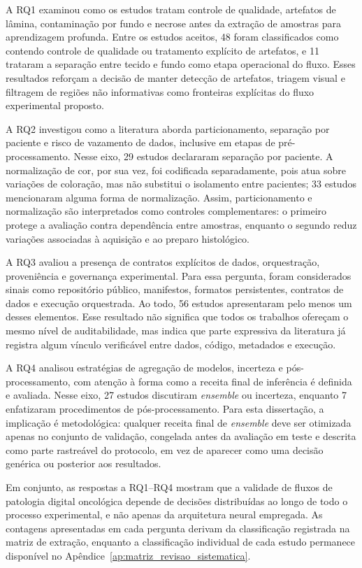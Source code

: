 A RQ1 examinou como os estudos tratam controle de qualidade, artefatos de
lâmina, contaminação por fundo e necrose antes da extração de amostras para
aprendizagem profunda. Entre os estudos aceitos, 48 foram classificados como
contendo controle de qualidade ou tratamento explícito de artefatos, e 11
trataram a separação entre tecido e fundo como etapa operacional do fluxo. Esses
resultados reforçam a decisão de manter detecção de artefatos, triagem visual e
filtragem de regiões não informativas como fronteiras explícitas do fluxo
experimental proposto.

A RQ2 investigou como a literatura aborda particionamento, separação por
paciente e risco de vazamento de dados, inclusive em etapas de pré-processamento.
Nesse eixo, 29 estudos declararam separação por paciente. A normalização de cor,
por sua vez, foi codificada separadamente, pois atua sobre variações de
coloração, mas não substitui o isolamento entre pacientes; 33 estudos
mencionaram alguma forma de normalização. Assim, particionamento e normalização
são interpretados como controles complementares: o primeiro protege a avaliação
contra dependência entre amostras, enquanto o segundo reduz variações associadas
à aquisição e ao preparo histológico.

A RQ3 avaliou a presença de contratos explícitos de dados, orquestração,
proveniência e governança experimental. Para essa pergunta, foram considerados
sinais como repositório público, manifestos, formatos persistentes, contratos de
dados e execução orquestrada. Ao todo, 56 estudos apresentaram pelo menos um
desses elementos. Esse resultado não significa que todos os trabalhos ofereçam o
mesmo nível de auditabilidade, mas indica que parte expressiva da literatura já
registra algum vínculo verificável entre dados, código, metadados e execução.

A RQ4 analisou estratégias de agregação de modelos, incerteza e
pós-processamento, com atenção à forma como a receita final de inferência é
definida e avaliada. Nesse eixo, 27 estudos discutiram \textit{ensemble} ou
incerteza, enquanto 7 enfatizaram procedimentos de pós-processamento. Para esta
dissertação, a implicação é metodológica: qualquer receita final de
\textit{ensemble} deve ser otimizada apenas no conjunto de validação, congelada
antes da avaliação em teste e descrita como parte rastreável do protocolo, em
vez de aparecer como uma decisão genérica ou posterior aos resultados.

Em conjunto, as respostas a RQ1--RQ4 mostram que a validade de fluxos de
patologia digital oncológica depende de decisões distribuídas ao longo de todo o
processo experimental, e não apenas da arquitetura neural empregada. As
contagens apresentadas em cada pergunta derivam da classificação registrada na
matriz de extração, enquanto a classificação individual de cada estudo permanece
disponível no Apêndice~\ref{ap:matriz_revisao_sistematica}. 
